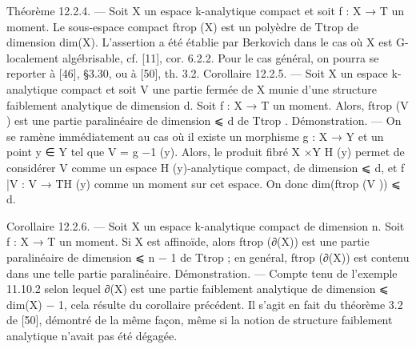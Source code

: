 \documentclass[
  10pt,
]{article}
\newenvironment{Shaded}{}{}
\newcommand{\NormalTok}[1]{#1}
\begin{document}
\begin{Shaded}
\begin{Highlighting}[]
\NormalTok{Théorème 12.2.4. — Soit X un espace k{-}analytique compact et soit f : X → T un}
\NormalTok{moment. Le sous{-}espace compact ftrop (X) est un polyèdre de Ttrop de dimension dim(X).}
\NormalTok{   L’assertion a été établie par Berkovich dans le cas où X est G{-}localement algébrisable,}
\NormalTok{cf. [11], cor. 6.2.2. Pour le cas général, on pourra se reporter à [46], §3.30, ou à [50],}
\NormalTok{th. 3.2.}
\NormalTok{Corollaire 12.2.5. — Soit X un espace k{-}analytique compact et soit V une partie}
\NormalTok{fermée de X munie d’une structure faiblement analytique de dimension d. Soit f : X → T}
\NormalTok{un moment. Alors, ftrop (V ) est une partie paralinéaire de dimension ⩽ d de Ttrop .}
\NormalTok{Démonstration. — On se ramène immédiatement au cas où il existe un morphisme}
\NormalTok{g : X → Y et un point y ∈ Y tel que V = g −1 (y). Alors, le produit fibré X ×Y H (y)}
\NormalTok{permet de considérer V comme un espace H (y){-}analytique compact, de dimension ⩽ d,}
\NormalTok{et f |V : V → TH (y) comme un moment sur cet espace. On donc dim(ftrop (V )) ⩽ d.}

\NormalTok{Corollaire 12.2.6. — Soit X un espace k{-}analytique compact de dimension n. Soit}
\NormalTok{f : X → T un moment. Si X est affinoïde, alors ftrop (∂(X)) est une partie paralinéaire}
\NormalTok{de dimension ⩽ n − 1 de Ttrop ; en genéral, ftrop (∂(X)) est contenu dans une telle partie}
\NormalTok{paralinéaire.}
\NormalTok{Démonstration. — Compte tenu de l’exemple 11.10.2 selon lequel ∂(X) est une partie}
\NormalTok{faiblement analytique de dimension ⩽ dim(X) − 1, cela résulte du corollaire précédent.}
\NormalTok{Il s’agit en fait du théorème 3.2 de [50], démontré de la même façon, même si la notion}
\NormalTok{de structure faiblement analytique n’avait pas été dégagée.}


\end{Highlighting}
\end{Shaded}
\end{document}
